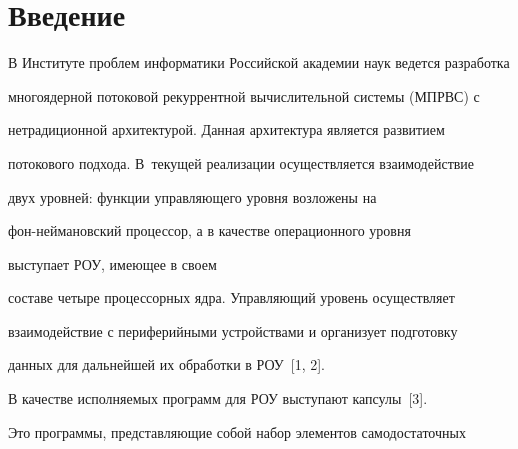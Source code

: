 












      \thispagestyle{headings}





      


            \label{st\stat}


            


            \vspace*{-12pt}





\section{Введение}


      


      В Институте проблем информатики Российской академии наук ведется разработка 


многоядерной потоковой рекуррентной вычислительной системы (МПРВС) с 


нетрадиционной архитектурой. Данная архитектура является развитием 


потокового подхода. В~текущей реализации осуществляется взаимодействие 


двух уровней: функции управ\-ля\-юще\-го уровня возложены на 


      фон-ней\-ма\-нов\-ский процессор, а в качестве операционного уровня 


выступает РОУ, имеющее в своем 


составе четыре процессорных ядра. Управляющий уровень осуществляет 


взаимодействие с периферийными устройствами и организует подготовку 


данных для дальнейшей их обработки в РОУ~[1, 2].


      


      В качестве исполняемых программ для РОУ выступают кап\-су\-лы~[3]. 


Это программы, представляющие собой набор элементов самодостаточных 


